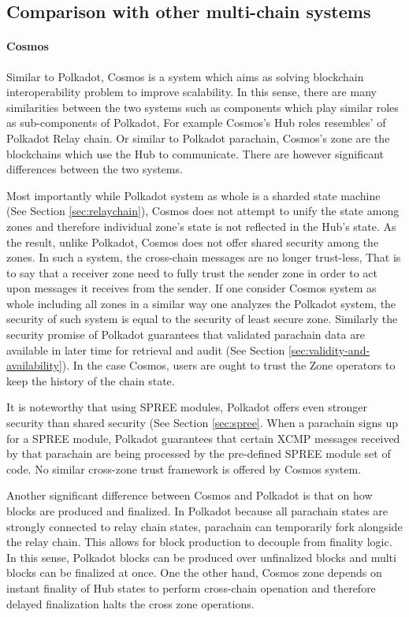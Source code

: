 \subsection{Comparison with other multi-chain systems}\label{sec:comparison}

\paragraph{Cosmos} 

Similar to Polkadot, Cosmos is a system which aims as solving blockchain interoperability problem to improve scalability. In this sense, there are many similarities between the two systems such as components which play similar roles as sub-components of Polkadot, For example Cosmos's Hub roles resembles' of Polkadot Relay chain. Or similar to Polkadot parachain, Cosmos's zone are the blockchains which use the Hub to communicate. There are however significant differences between the two systems. 

Most importantly while Polkadot system as whole is a sharded state machine (See Section \ref{sec:relaychain}), Cosmos does not attempt to unify the state among zones and therefore individual zone's state is not reflected in the Hub's state. As the result, unlike Polkadot, Cosmos does not offer shared security among the zones. In such a system, the cross-chain messages are no longer trust-less, That is to say that a receiver zone need to fully trust the sender zone in order to act upon messages it receives from the sender. If one consider Cosmos system as whole including all zones in a similar way one analyzes the Polkadot system, the security of such system is equal to the security of least secure zone. Similarly the security promise of Polkadot guarantees that validated parachain data are available in later time for retrieval and audit (See Section \ref{sec:validity-and-availability}). In the case Cosmos, users are ought to trust the Zone operators to keep the history of the chain state.

It is noteworthy that using SPREE modules, Polkadot offers even stronger security than shared security (See Section \ref{sec:spree}. When a parachain signs up for a SPREE module, Polkadot guarantees that certain XCMP messages received by that parachain are being processed by the  pre-defined SPREE module set of code. No similar cross-zone trust framework is offered by Cosmos system.

Another significant difference between Cosmos and Polkadot is that on how blocks are produced and finalized. In Polkadot because all parachain states are strongly connected to relay chain states, parachain can temporarily fork alongside the relay chain. This allows for block production to decouple from finality logic. In this sense, Polkadot blocks can be produced over unfinalized blocks and multi blocks can be finalized at once. One the other hand, Cosmos zone depends on instant finality of Hub states to perform cross-chain openation and therefore delayed finalization halts the cross zone operations.
